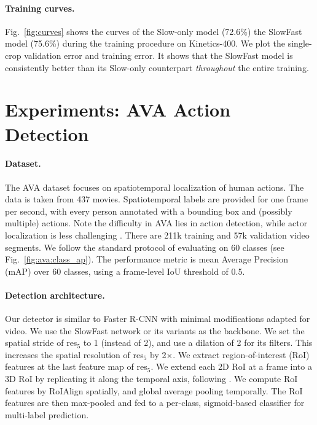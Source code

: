 \documentclass[10pt,twocolumn,letterpaper]{article}
\newcommand{\figref}[1]{Fig.~\ref{#1}}
\begin{document}
	
\paragraph{Training curves.} 	\figref{fig:curves} shows the curves of the Slow-only model (72.6\%) \vs the SlowFast model (75.6\%) during the training procedure on Kinetics-400. We plot the single-crop validation error and training error. It shows that the SlowFast model is consistently better than its Slow-only counterpart \emph{throughout} the entire training. 

	
	\section{Experiments: AVA Action Detection}\label{sec:detection}
	
	\paragraph{Dataset.}
	The AVA dataset \cite{Gu2018} focuses on spatiotemporal localization of human actions.
	The data is taken from 437 movies. Spatiotemporal labels are provided for one frame per second, with every person annotated with a bounding box and (possibly multiple) actions. Note the difficulty in AVA lies in action detection, while actor localization is less challenging \cite{Gu2018}. 
	There are 211k training and 57k validation video segments. We follow the standard protocol  \cite{Gu2018} of evaluating on 60 classes (see \figref{fig:ava:class_ap}).
	The performance metric is mean Average Precision (mAP) over 60 classes, using a frame-level IoU threshold of 0.5. 
	
	\paragraph{Detection architecture.}
		Our detector is similar to Faster R-CNN \cite{Ren2015} with minimal modifications adapted for video.
	We use the SlowFast network or its variants as the backbone.
	We set the spatial stride of res$_5$ to 1 (instead of 2), and use a dilation of 2 for its filters. This increases the spatial resolution of res$_5$ by 2$\times$.
	We extract region-of-interest (RoI) features \cite{Girshick2015} at the last feature map of res$_5$.
	We extend each 2D RoI at a frame into a 3D RoI by replicating it along the temporal axis, following \cite{Gu2018}. We compute RoI features by RoIAlign \cite{He2017} spatially, and global average pooling temporally. The RoI features are then max-pooled and fed to a per-class, sigmoid-based classifier for multi-label prediction.
	
\end{document}
